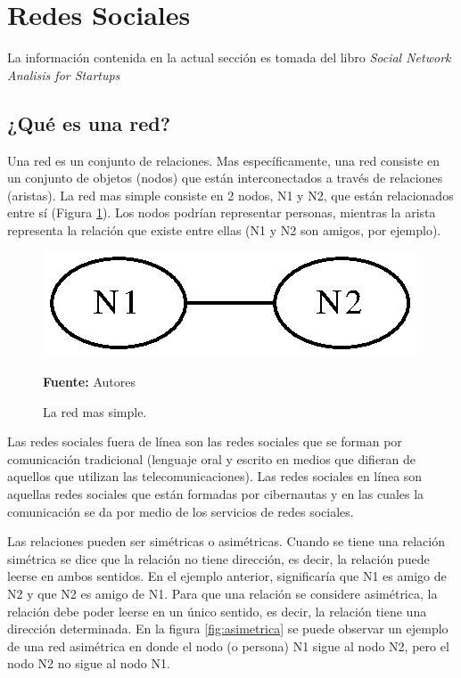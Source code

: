 \section{Redes Sociales} \label{sec:red}

La información contenida en la actual sección es tomada del libro \textit{Social Network Analisis for Startups} \cite{sna_startups}

\subsection{¿Qué es una red?}

Una red es un conjunto de relaciones. Mas específicamente, una red consiste en un conjunto de objetos (nodos) que están interconectados a través de relaciones (aristas). La red mas simple consiste en 2 nodos, N1 y N2, que están relacionados entre sí (Figura \ref{fig:simple}). Los nodos podrían representar personas, mientras la arista representa la relación que existe entre ellas (N1 y N2 son amigos, por ejemplo).

\begin{figure}[!htb]
  \begin{center}
    \includegraphics{./imagenes/Red_simple.eps}
    \caption{La red mas simple.}
    \label{fig:simple}
    \textbf{Fuente:}  Autores
  \end{center}
\end{figure}

Las redes sociales fuera de línea son las redes sociales que se forman por comunicación tradicional (lenguaje oral y escrito en medios que difieran de aquellos que utilizan las telecomunicaciones). Las redes sociales en línea son aquellas redes sociales que están formadas por cibernautas y en las cuales la comunicación se da por medio de los servicios de redes sociales. \cite{analysis}

Las relaciones pueden ser simétricas o asimétricas. Cuando se tiene una relación simétrica se dice que la relación no tiene dirección, es decir, la relación puede leerse en ambos sentidos. En el ejemplo anterior, significaría que N1 es amigo de N2 y que N2 es amigo de N1. Para que una relación se considere asimétrica, la relación debe poder leerse en un único sentido, es decir, la relación tiene una dirección determinada. En la figura \ref{fig:asimetrica} se puede observar un ejemplo de una red asimétrica en donde el nodo (o persona) N1 sigue al nodo N2, pero el nodo N2 no sigue al nodo N1.

